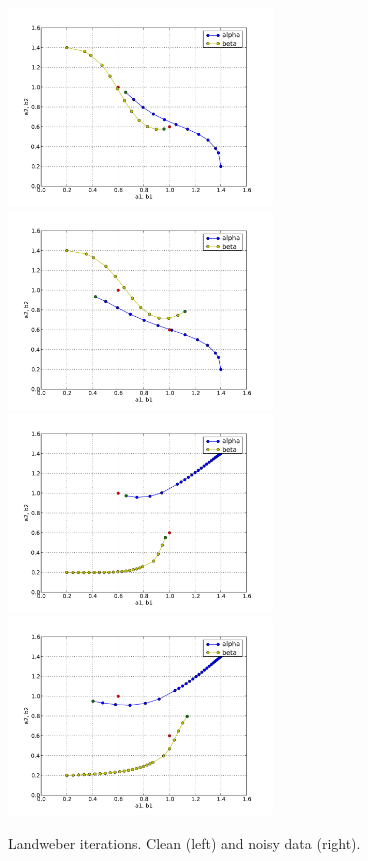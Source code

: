 \begin{figure}
\begin{center}
    \includegraphics[width=7cm]{chapters/schroll/pdf/4D-1scan3b.pdf}
    \includegraphics[width=7cm]{chapters/schroll/pdf/4D-1scan3b-5.pdf}
    \includegraphics[width=7cm]{chapters/schroll/pdf/4D-1scan4b.pdf}
    \includegraphics[width=7cm]{chapters/schroll/pdf/4D-1scan4b-5.pdf}
    \end{center}
    \vspace{-0.7cm}
  \caption{Landweber iterations. Clean (left) and noisy data (right). \label{fig6}}
\end{figure}

